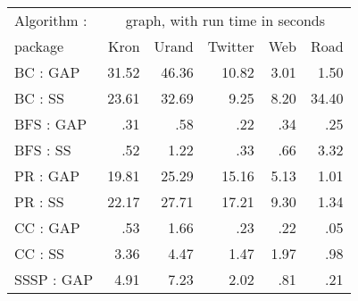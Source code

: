\begin{table}
\begin{center}
\begin{tabular}{|l|rrrrr|}
\hline
Algorithm :    &   \multicolumn{5}{c|}{graph, with run time in seconds}  \\
 package       &   Kron    &   Urand   &   Twitter  &  Web    &    Road  \\
\hline
BC   : GAP     &  31.52    &  46.36    &  10.82     &  3.01   &    1.50  \\
BC   : SS      &  23.61    &  32.69    &   9.25     &  8.20   &   34.40  \\     %
\hline
BFS  : GAP     &    .31    &    .58    &    .22     &   .34   &     .25  \\
BFS  : SS      &    .52    &   1.22    &    .33     &   .66   &    3.32  \\     %
\hline
PR   : GAP     &  19.81    &  25.29    &  15.16     &  5.13   &    1.01  \\
PR   : SS      &  22.17    &  27.71    &  17.21     &  9.30   &    1.34  \\     %
\hline
CC   : GAP     &    .53    &   1.66    &    .23     &   .22   &     .05  \\
CC   : SS      &   3.36    &   4.47    &   1.47     &  1.97   &     .98  \\     %
\hline
SSSP : GAP     &   4.91    &   7.23    &   2.02     &   .81   &     .21  \\

\end{tabular}
\end{center}
\end{table}
